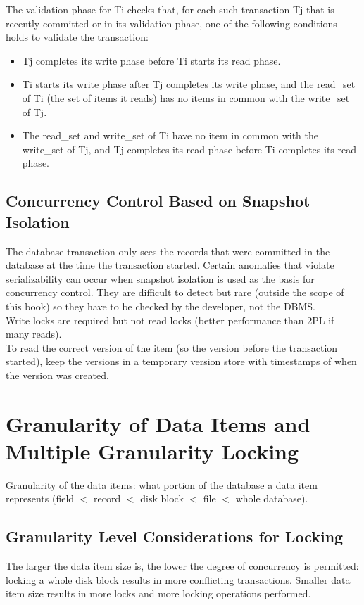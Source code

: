 The validation phase for Ti checks that, for each such transaction Tj that is recently committed or in its validation phase, one of the following conditions holds to validate the transaction:
\begin{itemize}
    \item Tj completes its write phase before Ti starts its read phase.
    \item Ti starts its write phase after Tj completes its write phase, and the read\_set of Ti (the set of items it reads) has no items in common with the write\_set of Tj.
    \item The read\_set and write\_set of Ti have no item in common with the write\_set of Tj, and Tj completes its read phase before Ti completes its read phase.
\end{itemize}

\subsection{Concurrency Control Based on Snapshot Isolation}
The database transaction only sees the records that were committed in the database at the time the transaction started. Certain anomalies that violate serializability can occur when snapshot isolation is used as the basis for concurrency control. They are difficult to detect but rare (outside the scope of this book) so they have to be checked by the developer, not the DBMS.\\

Write locks are required but not read locks (better performance than 2PL if many reads).\\

To read the correct version of the item (so the version before the transaction started), keep the versions in a temporary version store with timestamps of when the version was created.

\section{Granularity of Data Items and Multiple Granularity Locking}
Granularity of the data items: what portion of the database a data item represents (field $<$ record $<$ disk block $<$ file $<$ whole database).

\subsection{Granularity Level Considerations for Locking}
The larger the data item size is, the lower the degree of concurrency is permitted: locking a whole disk block results in more conflicting transactions. Smaller data item size results in more locks and more locking operations performed.

